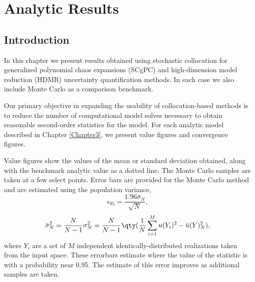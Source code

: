 
\chapter{Analytic Results} %

\label{ch:results} %



\section{Introduction}
In this chapter we present results obtained using stochastic collocation for generalized polynomial chaos
expansions (SCgPC) and high-dimension model reduction (HDMR) uncertainty quantification methods.  In each case
we also include Monte Carlo as a comparison benchmark.

Our primary objective in expanding the usability of collocation-based methods is to reduce the number of
computational model solves necessary to obtain reasonable second-order statistics for the model.  For each
analytic model described in Chapter \ref{Chapter3}, we present value figures and convergence figures.  

Value figures show the values of the mean or standard deviation obtained, along with the benchmark analytic
value as a dotted line.  The Monte Carlo samples are taken at a few select points.  Error bars are provided
for the Monte Carlo method and are estimated using the population variance,
\begin{equation}
  \epsilon_{95} = \frac{1.96\bar\sigma_N}{\sqrt{N}},
\end{equation}
\begin{equation}
  \bar\sigma_N^2 = \frac{N}{N-1}\sigma^2_N = \frac{N}{N-1}\qty(\frac{1}{N}\sum_{i=1}^M u(Y_i)^2 - \bar
  u(Y)^2_N),
\end{equation}
where $Y_i$ are a set of $M$ independent identically-distributed realizations taken from the input space.
These errorbars estimate where the value of the statistic is with a probability near 0.95.  The estimate of
this error improves as additional samples are taken.

